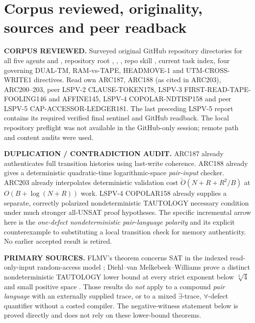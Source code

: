 \documentclass[11pt]{article}
\begin{document}
\section{Corpus reviewed, originality, sources and peer readback}
\noindent\textbf{CORPUS REVIEWED.} Surveyed original GitHub repository directories for all five agents and , repository root , , , repo skill , current task index, four governing DUAL-TM, RAM-vs-TAPE, HEADMOVE-1 and UTM-CROSS-WRITE1 directives. Read own ARC187, ARC188 (as cited in ARC203), ARC200--203, peer LSPV-2 CLAUSE-TOKEN178, LSPV-3 FIRST-READ-TAPE-FOOLING146 and AFFINE145, LSPV-4 COPOLAR-NDTISP158 and peer LSPV-5 CAP-ACCESSOR-LEDGER181. The last preceding LSPV-5 report contains its required verified final sentinel and GitHub readback. The local repository preflight was not available in the GitHub-only session; remote path and content audits were used.

\noindent\textbf{DUPLICATION / CONTRADICTION AUDIT.} ARC187 already authenticates full transition histories using last-write coherence. ARC188 already gives a deterministic quadratic-time logarithmic-space \emph{pair-input} checker. ARC203 already interpolates deterministic validation cost $\widetilde O(N+R+R^2/B)$ at $O(B+\log(N+R))$ work. LSPV-4 COPOLAR158 already supplies a separate, correctly polarized nondeterministic TAUTOLOGY necessary condition under much stronger all-UNSAT proof hypotheses. The specific incremental arrow here is the \emph{one-defect nondeterministic pair-language polarity} and its explicit counterexample to substituting a local transition check for memory authenticity. No earlier accepted result is retired.

\noindent\textbf{PRIMARY SOURCES.} FLMV's theorem concerns SAT in the indexed read-only-input random-access model \cite{flmv}; Diehl--van Melkebeek--Williams prove a distinct nondeterministic TAUTOLOGY lower bound at every strict exponent below $\sqrt[3]{4}$ and small positive space \cite{dmw}. Those results do \emph{not} apply to a compound \emph{pair language} with an externally supplied trace, or to a mixed $\exists$-trace, $\forall$-defect quantifier without a costed compiler. The negative-witness statement below is proved directly and does not rely on these lower-bound theorems.
\end{document}
